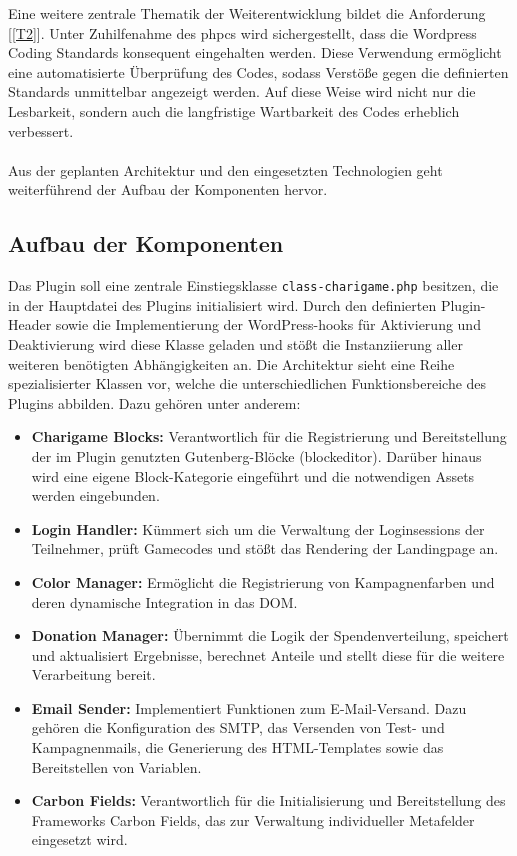 Eine weitere zentrale Thematik der Weiterentwicklung bildet die Anforderung [\ref{T2}].
Unter Zuhilfenahme des \gls{phpcs} wird sichergestellt, dass die Wordpress Coding Standards konsequent eingehalten werden.
Diese Verwendung ermöglicht eine automatisierte Überprüfung des Codes, sodass Verstöße gegen die definierten Standards unmittelbar angezeigt werden.
Auf diese Weise wird nicht nur die Lesbarkeit, sondern auch die langfristige Wartbarkeit des Codes erheblich verbessert.
\\\\
Aus der geplanten Architektur und den eingesetzten Technologien geht weiterführend der Aufbau der Komponenten hervor.

\subsection{Aufbau der Komponenten}
Das Plugin soll eine zentrale Einstiegsklasse \texttt{class-charigame.php} besitzen, die in der Hauptdatei des Plugins initialisiert wird.
Durch den definierten Plugin-Header sowie die Implementierung der WordPress-\glspl{hook} für Aktivierung und Deaktivierung wird diese Klasse geladen und stößt die Instanziierung aller weiteren benötigten Abhängigkeiten an.
Die Architektur sieht eine Reihe spezialisierter Klassen vor, welche die unterschiedlichen Funktionsbereiche des Plugins abbilden.
Dazu gehören unter anderem:

\begin{itemize}
    \item \textbf{Charigame Blocks:} Verantwortlich für die Registrierung und Bereitstellung der im Plugin genutzten Gutenberg-Blöcke (\gls{blockeditor}).
    Darüber hinaus wird eine eigene Block-Kategorie eingeführt und die notwendigen Assets werden eingebunden.
    \item \textbf{Login Handler:} Kümmert sich um die Verwaltung der Loginsessions der Teilnehmer, prüft Gamecodes und stößt das Rendering der Landingpage an.
    \item \textbf{Color Manager:} Ermöglicht die Registrierung von Kampagnenfarben und deren dynamische Integration in das DOM.
    \item \textbf{Donation Manager:} Übernimmt die Logik der Spendenverteilung, speichert und aktualisiert Ergebnisse, berechnet Anteile und stellt diese für die weitere Verarbeitung bereit.
    \item \textbf{Email Sender:} Implementiert Funktionen zum E-Mail-Versand.
    Dazu gehören die Konfiguration des SMTP, das Versenden von Test- und Kampagnenmails, die Generierung des HTML-Templates sowie das Bereitstellen von Variablen.
    \item \textbf{Carbon Fields:} Verantwortlich für die Initialisierung und Bereitstellung des Frameworks Carbon Fields, das zur Verwaltung individueller Metafelder eingesetzt wird.
\end{itemize}

